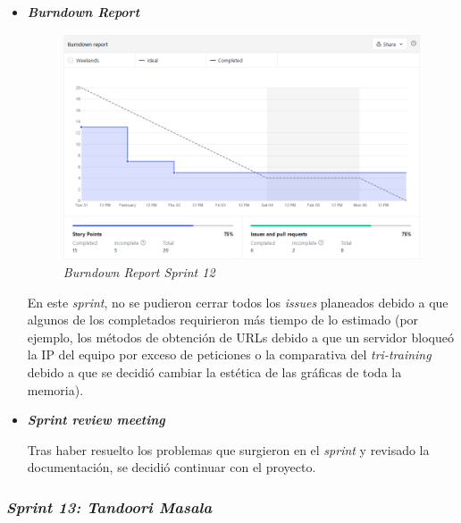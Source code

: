 \begin{itemize}
	\item \textbf{\textit{Burndown Report}}
		\begin{figure}[h]
		\caption[\textit{Sprint} 12: \textit{burndown report}]{\textit{Burndown Report Sprint 12}}
			\centering
			\includegraphics[width=\textwidth]{../img/anexos/bdr/s12_bdr}
		\end{figure}
		
		En este \textit{sprint}, no se pudieron cerrar todos los \textit{issues} planeados debido a que algunos de los completados requirieron más tiempo de lo estimado (por ejemplo, los métodos de obtención de URLs debido a que un servidor bloqueó la IP del equipo por exceso de peticiones o la comparativa del \textit{tri-training} debido a que se decidió cambiar la estética de las gráficas de toda la memoria).
		
	\item \textbf{\textit{Sprint review meeting}}
	
	Tras haber resuelto los problemas que surgieron en el \textit{sprint} y revisado la documentación, se decidió continuar con el proyecto.
	\end{itemize}




\subsubsection{\textit{Sprint 13: Tandoori Masala}}

